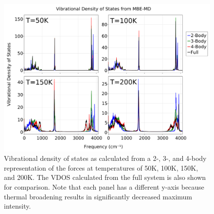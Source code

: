\begin{figure}[h]
\uwsinglespace
\begin{center}
\begin{minipage}{0.9\textwidth}
\includegraphics[width=\textwidth]{Figures/Chapter_4/ch4_figure_4.png}
\end{minipage}
\end{center}
\caption[Vibrational density of states as calculated from a 2-, 3-, and 4-body representation of the forces at temperatures of 50K, 100K, 150K, and 200K. The VDOS calculated from the full system is also shown for comparison. Note that each panel has a different y-axis because thermal broadening results in significantly decreased maximum intensity.]{Vibrational density of states as calculated from a 2-, 3-, and 4-body representation of the forces at temperatures of 50K, 100K, 150K, and 200K. The VDOS calculated from the full system is also shown for comparison. Note that each panel has a different y-axis because thermal broadening results in significantly decreased maximum intensity.}
\label{fig:MBE_MD_F4}
\end{figure}